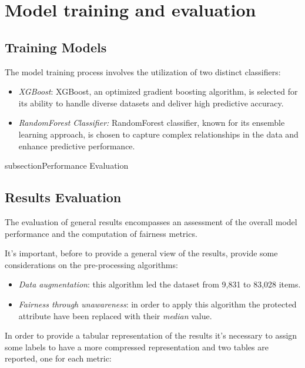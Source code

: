 \section{Model training and evaluation}
\label{section:val_mt_eval}

\subsection{Training Models}

The model training process involves the utilization of two distinct classifiers:

\begin{itemize}

    \item \emph{XGBoost}: XGBoost, an optimized gradient boosting algorithm, is selected for its ability to handle diverse datasets and deliver high predictive accuracy.

    \item \emph{RandomForest Classifier:} RandomForest classifier, known for its ensemble learning approach, is chosen to capture complex relationships in the data and enhance predictive performance.

\end{itemize}

subsection{Performance Evaluation}

\subsection{Results Evaluation}

The evaluation of general results encompasses an assessment of the overall model performance and the computation of fairness metrics.

It's important, before to provide a general view of the results, provide some considerations on the pre-processing algorithms:

\begin{itemize}
    \item \emph{Data augmentation}: this algorithm led the dataset from 9,831 to 83,028 items.
    \item \emph{Fairness through unawareness}: in order to apply this algorithm the protected attribute have been replaced with their \emph{median} value.
\end{itemize}

In order to provide a tabular representation of the results it's necessary to assign some labels to have a more compressed representation and two tables are reported, one for each metric:

